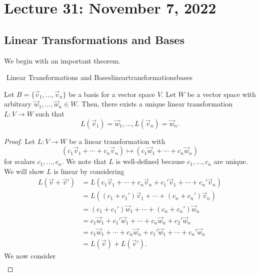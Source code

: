 \section{Lecture 31: November 7, 2022}

    \subsection{Linear Transformations and Bases}

        We begin with an important theorem.
        \begin{theorem}{\Stop\,\,Linear Transformations and Bases}{lineartransformationsbases}

            Let \(B=\{\vec{v}_1,\ldots,\vec{v}_n\}\) be a basis for a vector space \(V\). Let \(W\) be a vector space with arbitrary \(\vec{w}_1,\ldots,\vec{w}_n\in W\). Then, there exists a unique linear transformation \(L:V\to W\) such that
            \begin{equation*}
                L(\vec{v}_1)=\vec{w}_1,\ldots,L(\vec{v}_n)=\vec{w}_n.
            \end{equation*}
            \begin{proof}
                Let \(L:V\to W\) be a linear transformation with
                \begin{equation*}
                    (c_1\vec{v}_1+\cdots+c_n\vec{v}_n)\mapsto(c_1\vec{w}_1+\cdots+c_n\vec{w}_n)
                \end{equation*}
                for scalars \(c_1,\ldots,c_n\). We note that \(L\) is well-defined because \(c_1,\ldots,c_n\) are unique. We will show \(L\) is linear by considering
                \begin{align*}
                    L(\vec{v}+\vec{v}')&=L(c_1\vec{v}_1+\cdots+c_n\vec{v}_n+c_1'\vec{v}_1+\cdots+c_n'\vec{v}_n) \\
                    &=L((c_1+c_1')\vec{v}_1+\cdots+(c_n+c_n')\vec{v}_n) \\
                    &=(c_1+c_1')\vec{w}_1+\cdots+(c_n+c_n')\vec{w}_n \\
                    &=c_1\vec{w}_1+c_1'\vec{w}_1+\cdots+c_n\vec{w}_n+c_2'\vec{w}_n \\
                    &=c_1\vec{w}_1+\cdots+c_n\vec{w}_n+c_1'\vec{w}_1+\cdots+c_n'\vec{w}_n \\
                    &=L(\vec{v})+L(\vec{v}').
                \end{align*}
                We now consider
                \begin{align*}

\end{align*}
\end{proof}
\end{theorem}
